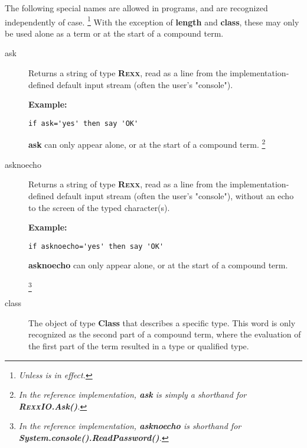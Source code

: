 The following special names are allowed in \nr{} programs, and are
recognized independently of case.
\footnote{
\emph{Unless  is in effect.
}
}
With the exception of \textbf{length} and \textbf{class}, these
may only be used alone as a term or at the start of a compound term.
\begin{description}
\item[ask]\label{refswask}
 
Returns a string of type \textbf{R\textsc{exx}}, read as a line from the
implementation-defined default input stream (often the user's
"console").

\textbf{Example:}
\begin{lstlisting}
if ask='yes' then say 'OK'
\end{lstlisting}
 \textbf{ask} can only appear alone, or at the start of a
compound term.
\footnote{
\emph{In the reference implementation, \textbf{ask} is simply a shorthand
for \textbf{R\textsc{exx}IO.Ask()}.}
}


\item[asknoecho]\label{refswasknoecho}
 
Returns a string of type \textbf{R\textsc{exx}}, read as a line from the
implementation-defined default input stream (often the user's
"console"), without an echo to the screen of the typed character(s).

\textbf{Example:}
\begin{lstlisting}
if asknoecho='yes' then say 'OK'
\end{lstlisting}
 \textbf{asknoecho} can only appear alone, or at the start of a
compound term.

\footnote{
\emph{In the reference implementation, \textbf{asknoecho} is shorthand
for \textbf{System.console().ReadPassword()}.}
}
\item[class]\label{refswclass}
 
The object of type \textbf{Class} that describes a specific type.
This word is only recognized as the second part of a compound term,
where the evaluation of the first part of the term resulted in a
type or qualified type.


\end{description}
